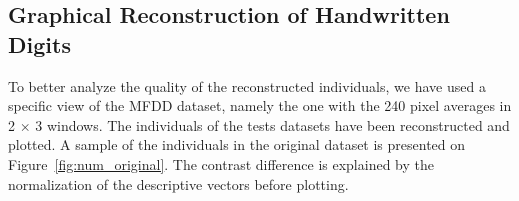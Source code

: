 \subsection{Graphical Reconstruction of Handwritten Digits}
\label{sec:num}

To better analyze the quality of the reconstructed individuals, we have used a specific view of the MFDD dataset, namely the one with the 240 pixel averages in 2 $\times$ 3 windows. The individuals of the tests datasets have been reconstructed and plotted. A sample of the individuals in the original dataset is presented on Figure~\ref{fig:num_original}. The contrast difference is explained by the normalization of the descriptive vectors before plotting.

\begin{figure}[H]
    \centering

\end{figure}
